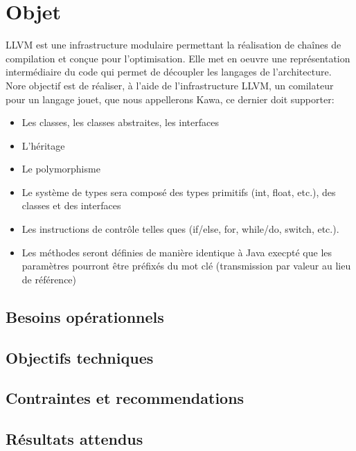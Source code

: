 \documentclass{../res/univ-projet}
\begin{document}
\maketitle
\newpage
\tableofcontents
\newpage

\section{Objet}

LLVM est une infrastructure modulaire permettant la réalisation de
chaînes de compilation et conçue pour l'optimisation. Elle met en oeuvre
une représentation intermédiaire du code qui permet de découpler les
langages de l'architecture. Nore objectif est de réaliser, à l'aide de
l'infrastructure LLVM, un comilateur pour un langage jouet, que nous
appellerons Kawa, ce dernier doit supporter:
 \begin{itemize}
 	\item	Les classes, les classes abstraites, les interfaces
	\item   L'héritage
	\item   Le polymorphisme
	\item   Le système de types sera composé des types primitifs
	  (int, float, etc.), des classes et des interfaces
	\item   Les instructions de contrôle telles ques (if/else, for,
	  while/do, switch, etc.).
	\item   Les méthodes seront définies de manière identique à Java
	  execpté que les paramètres pourront être préfixés du mot clé
	   (transmission par valeur au lieu de référence)
 \end{itemize}


\subsection{Besoins opérationnels}
\subsection{Objectifs techniques}
\subsection{Contraintes et recommendations}
\subsection{Résultats attendus}
\end{document}

